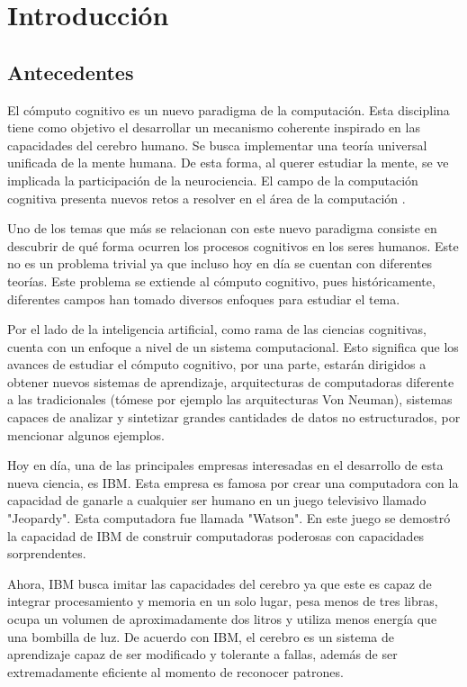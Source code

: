 \chapter{Introducci\'{o}n}
\label{ch:intro}

\section{Antecedentes}
El c\'{o}mputo cognitivo es un nuevo paradigma de la computaci\'{o}n. Esta disciplina tiene como objetivo el desarrollar un mecanismo coherente inspirado en las capacidades del cerebro humano. Se busca implementar una teor\'{i}a universal unificada de la mente humana. De esta forma, al querer estudiar la mente, se ve implicada la participaci\'{o}n de la neurociencia. El campo de la computaci\'{o}n cognitiva presenta nuevos retos a resolver en el \'{a}rea de la computaci\'{o}n \cite{cc}.

Uno de los temas que m\'{a}s se relacionan con este nuevo paradigma consiste en descubrir de qu\'{e} forma ocurren los procesos cognitivos en los seres humanos. Este no es un problema trivial ya que incluso hoy en d\'{i}a se cuentan con diferentes teor\'{i}as. Este problema se extiende al c\'{o}mputo cognitivo, pues hist\'{o}ricamente, diferentes campos han tomado diversos enfoques para estudiar el tema.

Por el lado de la inteligencia artificial, como rama de las ciencias cognitivas, cuenta con un enfoque a nivel de un sistema computacional. Esto significa que los avances de estudiar el c\'{o}mputo cognitivo, por una parte, estar\'{a}n dirigidos a obtener nuevos sistemas de aprendizaje, arquitecturas de computadoras diferente a las tradicionales (t\'{o}mese por ejemplo las arquitecturas Von Neuman), sistemas capaces de analizar y sintetizar grandes cantidades de datos no estructurados, por mencionar algunos ejemplos.

Hoy en d\'{i}a, una de las principales empresas interesadas en el desarrollo de esta nueva ciencia, es IBM. Esta empresa es famosa por crear una computadora con la capacidad de ganarle a cualquier ser humano en un juego televisivo llamado "Jeopardy". Esta computadora fue llamada "Watson". En este juego se demostr\'{o} la capacidad de IBM de construir computadoras poderosas con capacidades sorprendentes. 

Ahora, IBM busca imitar las capacidades del cerebro ya que este es capaz de integrar procesamiento y memoria en un solo lugar, pesa menos de tres libras, ocupa un volumen de aproximadamente dos litros y utiliza menos energ\'{i}a que una bombilla de luz. De acuerdo con IBM, el cerebro es un sistema de aprendizaje capaz de ser modificado y tolerante a fallas, adem\'{a}s de ser extremadamente eficiente al momento de reconocer patrones. 

